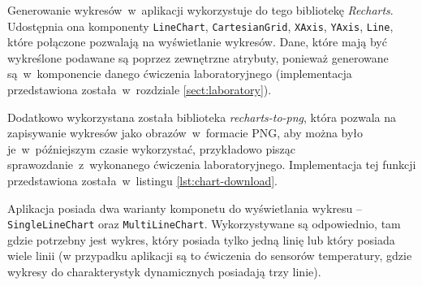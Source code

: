 Generowanie wykresów~w~aplikacji wykorzystuje do tego bibliotekę \textit{Recharts}. Udostępnia ona
komponenty \texttt{LineChart}, \texttt{CartesianGrid}, \texttt{XAxis}, \texttt{YAxis},
\texttt{Line}, które połączone pozwalają na wyświetlanie wykresów. Dane, które mają być wykreślone
podawane są poprzez zewnętrzne atrybuty, ponieważ generowane są~w~komponencie danego ćwiczenia
laboratoryjnego (implementacja przedstawiona została~w~rozdziale \ref{sect:laboratory}).

Dodatkowo wykorzystana została biblioteka \textit{recharts-to-png}, która pozwala na zapisywanie
wykresów jako obrazów~w~formacie PNG, aby można było je~w~późniejszym czasie wykorzystać,
przykładowo pisząc sprawozdanie~z~wykonanego ćwiczenia laboratoryjnego. Implementacja tej
funkcji przedstawiona została~w~listingu \ref{lst:chart-download}.


Aplikacja posiada dwa warianty komponetu do wyświetlania wykresu -- \texttt{SingleLineChart} oraz
\texttt{MultiLineChart}. Wykorzystywane są odpowiednio, tam gdzie potrzebny jest wykres, który
posiada tylko jedną linię lub który posiada wiele linii (w przypadku aplikacji są to ćwiczenia do
sensorów temperatury, gdzie wykresy do charakterystyk dynamicznych posiadają trzy linie).
